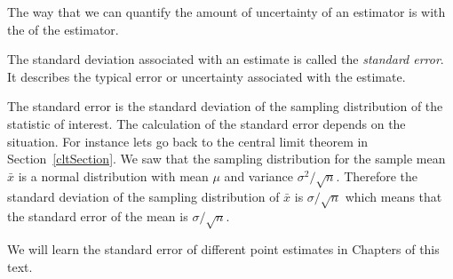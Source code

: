 The way that we can quantify the amount of uncertainty of an estimator is with the
 of the estimator.

%
%

\begin{termBox}{
The standard deviation associated with an estimate is called the \emph{standard error}. It describes the typical error or uncertainty associated with the estimate.}
\end{termBox}

The standard error is the standard deviation of the sampling distribution of the statistic of interest.
The calculation of the standard error depends on the situation.
For instance lets go back to the central limit theorem in Section~\ref{cltSection}.
We saw that the sampling distribution for the sample mean $\bar{x}$ 
is a normal distribution with mean $\mu$ and variance $\sigma^{2}/\sqrt{n}$.
Therefore the standard deviation of the sampling distribution of $\bar{x}$
is $\sigma/\sqrt{n}$
which means that the standard error of the mean is $\sigma/\sqrt{n}$.

We will learn the standard error of different point estimates in Chapters {\color{red}{REFERENCE}}
of this text.









